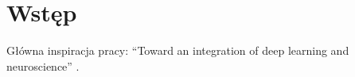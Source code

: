 \chapter*{Wstęp}

Główna inspiracja pracy: ``Toward an integration of deep learning and neuroscience'' \cite{marblestone2016toward}.
